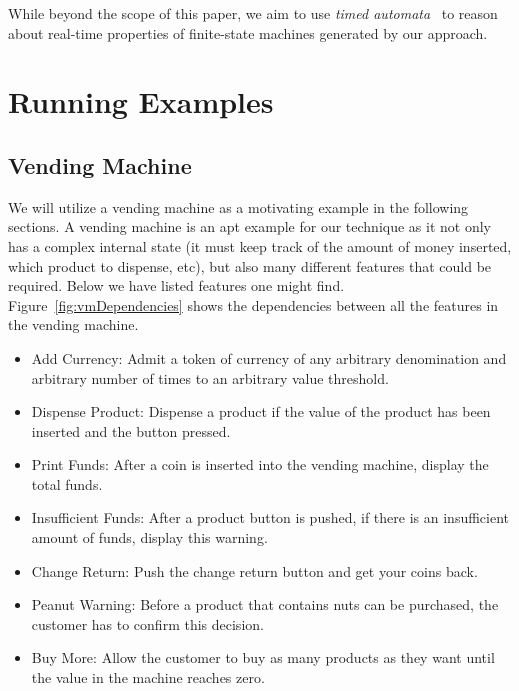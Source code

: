\documentclass[sigplan,anonymous,review]{acmart}
\begin{document}
While beyond the scope of this paper, we aim to use \emph{timed automata}~\cite{10.1145/2518102} to reason about real-time properties of finite-state machines generated by our approach.

\section{Running Examples}
\subsection{Vending Machine}\label{sec:vend}
We will utilize a vending machine as a motivating example in the following sections. A vending machine is an apt example for our technique as it not only has a complex internal state (it must keep track of the amount of money inserted, which product to dispense, etc), but also many different features that could be required. Below we have listed features one might find. Figure~\ref{fig:vmDependencies} shows the dependencies between all the features in the vending machine.

\begin{itemize}
    \item Add Currency: Admit a token of currency of any arbitrary denomination and arbitrary number of times to an arbitrary value threshold.
    \item Dispense Product: Dispense a product if the value of the product has been inserted and the button pressed.
    \item Print Funds: After a coin is inserted into the vending machine, display the total funds.
    \item Insufficient Funds: After a product button is pushed, if there is an insufficient amount of funds, display this warning.
    \item Change Return: Push the change return button and get your coins back.
    \item Peanut Warning: Before a product that contains nuts can be purchased, the customer has to confirm this decision.
    \item Buy More: Allow the customer to buy as many products as they want until the value in the machine reaches zero.
\end{itemize}
\end{document}
